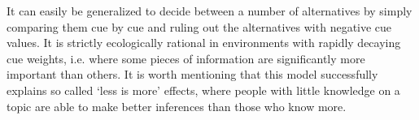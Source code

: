 It can easily be generalized to decide between a number of alternatives by simply comparing them cue by cue and ruling out the alternatives with negative cue values.
It is strictly ecologically rational in environments with rapidly decaying cue weights, i.e. where some pieces of information are significantly more important than others. It is worth mentioning that this model successfully explains so called `less is more' effects, where people with little knowledge on a topic are able to make better inferences than those who know more.



